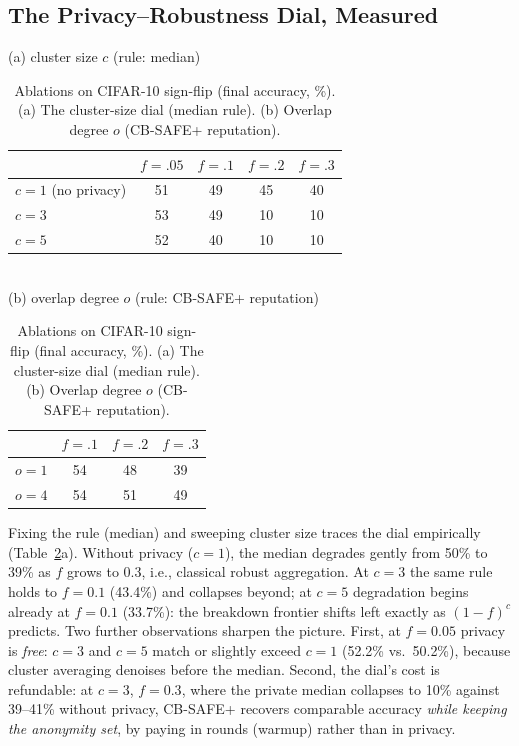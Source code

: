 \documentclass[lettersize,journal]{IEEEtran}
\begin{document}


\subsection{The Privacy--Robustness Dial, Measured}

\begin{table}[t]
\caption{Ablations on CIFAR-10 sign-flip (final accuracy, \%). (a) The cluster-size
dial (median rule). (b) Overlap degree $o$ (CB-SAFE+ reputation).}
\label{tab:ablation}
\centering
\footnotesize
\setlength{\tabcolsep}{5pt}
(a) cluster size $c$ (rule: median)\\[2pt]
\begin{tabular}{@{}lcccc@{}}
\toprule
 & $f{=}.05$ & $f{=}.1$ & $f{=}.2$ & $f{=}.3$\\
\midrule
$c{=}1$ (no privacy) & 51 & 49 & 45 & 40\\
$c{=}3$              & 53 & 49 & 10 & 10\\
$c{=}5$              & 52 & 40 & 10 & 10\\
\bottomrule
\end{tabular}\\[5pt]
(b) overlap degree $o$ (rule: CB-SAFE+ reputation)\\[2pt]
\begin{tabular}{@{}lccc@{}}
\toprule
 & $f{=}.1$ & $f{=}.2$ & $f{=}.3$\\
\midrule
$o{=}1$ & 54 & 48 & 39\\
$o{=}4$ & 54 & 51 & 49\\
\bottomrule
\end{tabular}
\end{table}

Fixing the rule (median) and sweeping cluster size traces the dial empirically
(Table~\ref{tab:ablation}a). Without privacy ($c{=}1$), the median degrades gently from
50\% to 39\% as $f$ grows to $0.3$, i.e., classical robust aggregation. At $c{=}3$ the
same rule holds to $f{=}0.1$ (43.4\%) and collapses beyond; at $c{=}5$ degradation
begins already at $f{=}0.1$ (33.7\%): the breakdown frontier shifts left exactly as
$(1-f)^c$ predicts. Two further observations sharpen the
picture. First, at $f{=}0.05$ privacy is \emph{free}: $c{=}3$ and $c{=}5$ match or
slightly exceed $c{=}1$ (52.2\% vs.\ 50.2\%), because cluster averaging denoises
before the median. Second, the dial's cost is refundable: at $c{=}3$, $f{=}0.3$,
where the private median collapses to 10\% against 39--41\% without privacy,
CB-SAFE+ recovers comparable accuracy \emph{while keeping the anonymity set},
by paying in rounds (warmup) rather than in privacy.
\end{document}
